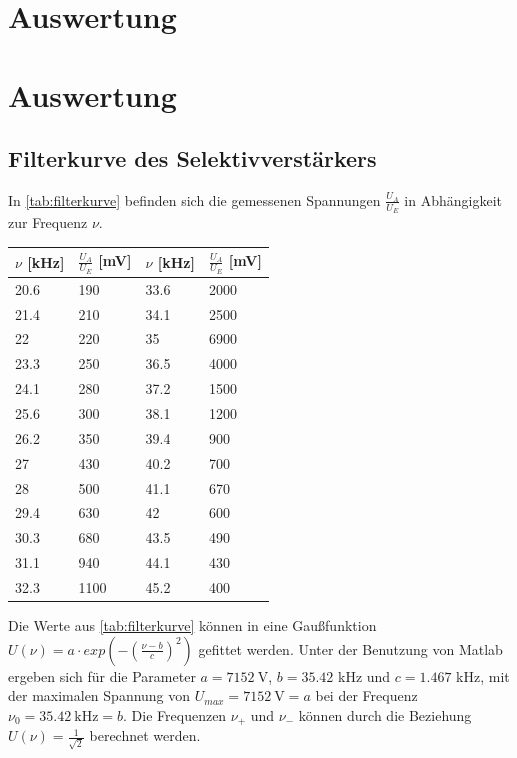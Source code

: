


\section{Auswertung}

\section{Auswertung}

\subsection{Filterkurve des Selektivverstärkers}
In \autoref{tab:filterkurve} befinden sich die gemessenen Spannungen $\frac{U_{A}}{U_{E}}$ in Abhängigkeit zur Frequenz $\nu$.
\begin{table}[H]
 \centering 
 \begin{tabular}{l|l|l|l} 
 $\nu$ [kHz]& $\frac{U_{A}}{U_{E}}$ [mV] & $\nu$ [kHz]& $\frac{U_{A}}{U_{E}}$ [mV]\\  \hline
 20.6 & 190 & 33.6 & 2000\\ 
 21.4 & 210 & 34.1 & 2500\\ 
 22   & 220 & 35   & 6900\\
 23.3 & 250 & 36.5 & 4000\\
 24.1 & 280 & 37.2 & 1500\\
 25.6 & 300 & 38.1 & 1200\\
 26.2 & 350 & 39.4 & 900\\
 27   & 430 & 40.2 & 700\\
 28   & 500 & 41.1 & 670\\
 29.4 & 630 & 42   & 600\\
 30.3 & 680 & 43.5 & 490\\
 31.1 & 940 & 44.1 & 430\\
 32.3 & 1100 & 45.2 & 400\\ \hline
 \end{tabular} 
 \label{tab:filterkurve}
\end{table} 
Die Werte aus \autoref{tab:filterkurve} können in eine Gaußfunktion $U(\nu)=a\cdot exp(-(\frac{\nu-b}{c})^2)$ gefittet werden. 
Unter der Benutzung von Matlab ergeben sich für die Parameter $a=7152\ \si{\V}$, $b=35.42$ kHz und $c=1.467$ kHz, 
mit der maximalen Spannung von $U_{max}=7152\ \si{\V}=a$ bei der Frequenz $\nu_{0}=35.42\ \si{\kHz}=b$. 
Die Frequenzen $\nu_{+}$ und $\nu_{-}$ können durch die Beziehung $U(\nu)=\frac{1}{\sqrt{2}}$ berechnet werden. 
